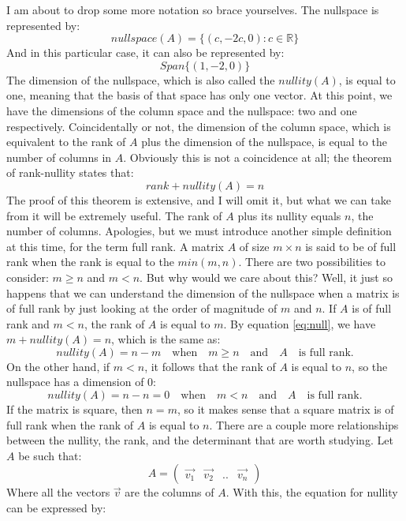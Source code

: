 \documentclass[600paper, 11pt,twoside,openany]{kdp}
\begin{document}
\indent I am about to drop some more notation so brace yourselves. The nullspace is represented by:
\[nullspace(A) =\lbrace (c,-2c, 0) : c \in \mathbb{R} \rbrace\]
\indent And in this particular case, it can also be represented by:
\[Span\lbrace (1,-2,0) \rbrace\]
\indent The dimension of the nullspace, which is also called the $nullity(A)$, is equal to one, meaning that the basis of that space has only one vector. At this point, we have the dimensions of the column space and the nullspace: two and one respectively. Coincidentally or not, the dimension of the column space, which is equivalent to the rank of $A$ plus the dimension of the nullspace, is equal to the number of columns in $A$. Obviously this is not a coincidence at all; the theorem of rank-nullity states that:
\begin{equation}\label{eq:null}
rank + nullity(A)  = n 
\end{equation}
\indent The proof of this theorem is extensive, and I will omit it, but what we can take from it will be extremely useful. The rank of $A$ plus its nullity equals $n$, the number of columns. Apologies, but we must introduce another simple definition at this time, for the term full rank. A matrix $A$ of size $m \times n$ is said to be of full rank when the rank is equal to the $min(m,n)$. There are two possibilities to consider: $m \geq n$ and $m < n$. But why would we care about this? Well, it just so happens that we can understand the dimension of the nullspace when a matrix is of full rank by just looking at the order of magnitude of $m$ and $n$. If $A$ is of full rank and $m<n$, the rank of $A$ is equal to $m$. By equation \ref{eq:null}, we have $m+ nullity(A)=n$, which is the same as:
\[nullity(A)  = n - m \quad \textrm{when} \quad    m \geq n  \quad \textrm{and} \quad A \quad \textrm{is full rank.}\]
On the other hand, if $m < n$, it follows that the rank of $A$ is equal to $n$, so the nullspace has a dimension of 0:
\[nullity(A)  = n - n = 0 \quad \textrm{when} \quad    m < n  \quad \textrm{and} \quad A \quad \textrm{is full rank.}\]
If the matrix is square, then $n = m$, so it makes sense that a square matrix is of full rank when the rank of $A$ is equal to $n$. There are a couple more relationships between the nullity, the rank, and the determinant that are worth studying. Let $A$ be such that:
\[A = \begin{pmatrix}
\overrightarrow{v_1} & \overrightarrow{v_2} & .. & \overrightarrow{v_n}
\end{pmatrix}
\]
\indent Where all the vectors $\overrightarrow{v}$ are the columns of $A$. With this, the equation for nullity can be expressed by:
\end{document}
